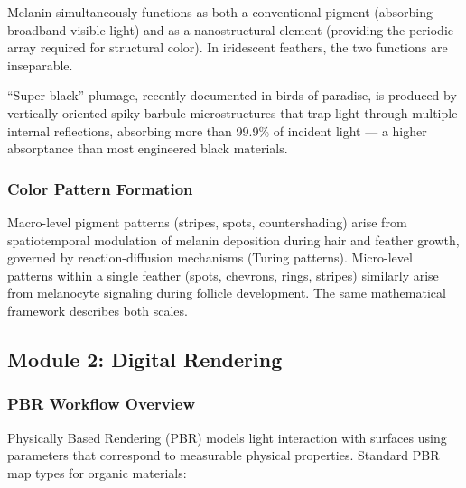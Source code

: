 \documentclass[11pt,letterpaper]{article}
\begin{document}
Melanin simultaneously functions as both a conventional pigment (absorbing broadband visible light) and as a nanostructural element (providing the periodic array required for structural color). In iridescent feathers, the two functions are inseparable.

``Super-black'' plumage, recently documented in birds-of-paradise, is produced by vertically oriented spiky barbule microstructures that trap light through multiple internal reflections, absorbing more than 99.9\% of incident light --- a higher absorptance than most engineered black materials.

\subsubsection{Color Pattern Formation}

Macro-level pigment patterns (stripes, spots, countershading) arise from spatiotemporal modulation of melanin deposition during hair and feather growth, governed by reaction-diffusion mechanisms (Turing patterns). Micro-level patterns within a single feather (spots, chevrons, rings, stripes) similarly arise from melanocyte signaling during follicle development. The same mathematical framework describes both scales.

\subsection{Module 2: Digital Rendering}

\subsubsection{PBR Workflow Overview}

Physically Based Rendering (PBR) models light interaction with surfaces using parameters that correspond to measurable physical properties. Standard PBR map types for organic materials:
\end{document}
